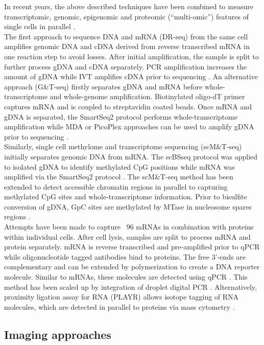 In recent years, the above described techniques have been combined to measure transcriptomic, genomic, epigenomic and proteomic (“multi-omic”) features of single cells in parallel \citep{Macaulay2017}. \\
The first approach to sequence DNA and mRNA (DR-seq) from the same cell amplifies genomic DNA and cDNA derived from reverse transcribed mRNA in one reaction step to avoid losses. After initial amplification, the sample is split to further process gDNA and cDNA separately. PCR amplification increases the amount of gDNA while IVT amplifies cDNA prior to sequencing \citep{Dey2015}. An alternative approach (G\&{}T-seq) firstly separates gDNA and mRNA before whole-transcriptome and whole-genome amplification. Biotinylated oligo-dT primer captures mRNA and is coupled to streptavidin coated beads. Once mRNA and gDNA is separated, the SmartSeq2 protocol performs whole-transcriptome amplification while MDA or PicoPlex approaches can be used to amplify gDNA prior to sequencing \citep{Macaulay2015}.\\
Similarly, single cell methylome and transcriptome sequencing (scM\&{}T-seq) initially separates genomic DNA from mRNA. The scBSseq protocol was applied to isolated gDNA to identify methylated CpG positions while mRNA was amplified via the SmartSeq2 protocol \citep{Angermueller2016a}.   
The scM\&{}T-seq method has been extended to detect accessible chromatin regions in parallel to capturing methylated CpG sites and whole-transcriptome information. Prior to bisulfite conversion of gDNA, GpC sites are methylated by MTase in nucleosome spares regions \citep{Pott2017, Clark2018}.\\ 
Attempts have been made to capture ~96 mRNAs in combination with proteins within individual cells. After cell lysis, samples are split to process mRNA and protein separately. mRNA is reverse transcribed and pre-amplified prior to qPCR while oligonucleotide tagged antibodies bind to proteins. The free 3’-ends are complementary and can be extended by polymerization to create a DNA reporter molecule. Similar to mRNAs, these molecules are detected using qPCR \citep{Darmanis2016}. This method has been scaled up by integration of droplet digital PCR \citep{Albayrak2016}. Alternatively, proximity ligation assay for RNA (PLAYR) allows isotope tagging of RNA molecules, which are detected in parallel to proteins via mass cytometry \citep{Frei2016}.

\subsection{Imaging approaches}

